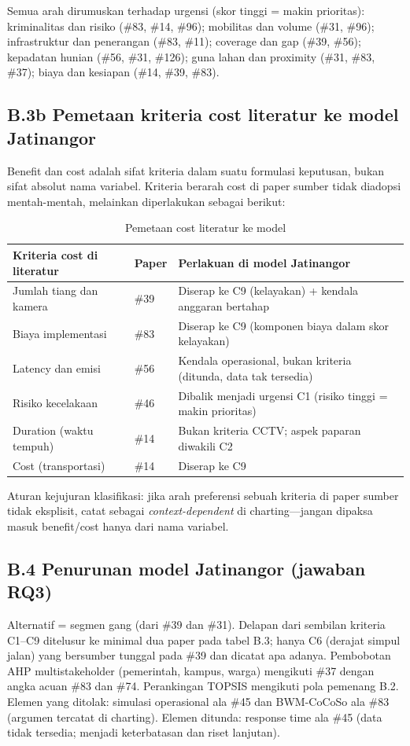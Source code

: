 \documentclass[a4paper,11pt]{article}
\begin{document}
Semua arah dirumuskan terhadap urgensi (skor tinggi = makin prioritas): kriminalitas dan risiko (\#83, \#14, \#96); mobilitas dan volume (\#31, \#96); infrastruktur dan penerangan (\#83, \#11); coverage dan gap (\#39, \#56); kepadatan hunian (\#56, \#31, \#126); guna lahan dan proximity (\#31, \#83, \#37); biaya dan kesiapan (\#14, \#39, \#83).

\subsection*{B.3b Pemetaan kriteria cost literatur ke model Jatinangor}

Benefit dan cost adalah sifat kriteria dalam suatu formulasi keputusan, bukan sifat absolut nama variabel. Kriteria berarah cost di paper sumber tidak diadopsi mentah-mentah, melainkan diperlakukan sebagai berikut:

\begin{table}[htbp]
\centering
\begin{tabular}{p{4.5cm}p{2.5cm}p{7cm}}
\toprule
\textbf{Kriteria cost di literatur} & \textbf{Paper} & \textbf{Perlakuan di model Jatinangor} \\
\midrule
Jumlah tiang dan kamera & \#39 & Diserap ke C9 (kelayakan) + kendala anggaran bertahap \\
Biaya implementasi & \#83 & Diserap ke C9 (komponen biaya dalam skor kelayakan) \\
Latency dan emisi & \#56 & Kendala operasional, bukan kriteria (ditunda, data tak tersedia) \\
Risiko kecelakaan & \#46 & Dibalik menjadi urgensi C1 (risiko tinggi = makin prioritas) \\
Duration (waktu tempuh) & \#14 & Bukan kriteria CCTV; aspek paparan diwakili C2 \\
Cost (transportasi) & \#14 & Diserap ke C9 \\
\bottomrule
\end{tabular}
\caption{Pemetaan cost literatur ke model}
\end{table}

Aturan kejujuran klasifikasi: jika arah preferensi sebuah kriteria di paper sumber tidak eksplisit, catat sebagai \textit{context-dependent} di charting---jangan dipaksa masuk benefit/cost hanya dari nama variabel.

\subsection*{B.4 Penurunan model Jatinangor (jawaban RQ3)}

Alternatif = segmen gang (dari \#39 dan \#31). Delapan dari sembilan kriteria C1--C9 ditelusur ke minimal dua paper pada tabel B.3; hanya C6 (derajat simpul jalan) yang bersumber tunggal pada \#39 dan dicatat apa adanya. Pembobotan AHP multistakeholder (pemerintah, kampus, warga) mengikuti \#37 dengan angka acuan \#83 dan \#74. Perankingan TOPSIS mengikuti pola pemenang B.2. Elemen yang ditolak: simulasi operasional ala \#45 dan BWM-CoCoSo ala \#83 (argumen tercatat di charting). Elemen ditunda: response time ala \#45 (data tidak tersedia; menjadi keterbatasan dan riset lanjutan).
\end{document}
